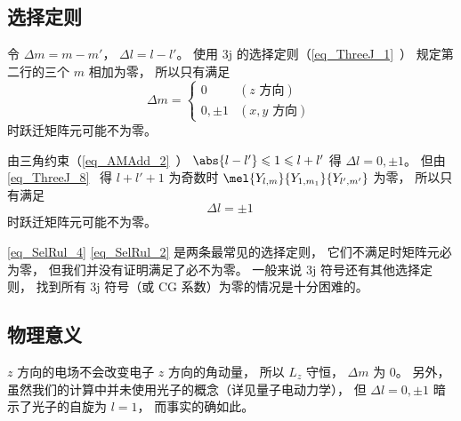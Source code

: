 \subsection{选择定则}
令 $\Delta m = m - m'$， $\Delta l = l - l'$。 使用 3j 的选择定则（\autoref{eq_ThreeJ_1}~） 规定第二行的三个 $m$ 相加为零， 所以只有满足
\begin{equation}\label{eq_SelRul_4}
\Delta m =
\begin{cases}
0 & (\text{$z$ 方向}) \\
0, \pm 1 & (\text{$x, y$ 方向})
\end{cases}~
\end{equation}
时跃迁矩阵元可能不为零。

由三角约束（\autoref{eq_AMAdd_2}~） $\abs{l-l'} \leqslant 1 \leqslant l + l'$ 得 $\Delta l = 0, \pm 1$。 但由\autoref{eq_ThreeJ_8}~ 得 $l + l' + 1$ 为奇数时 $\mel{Y_{l,m}}{Y_{1,m_1}}{Y_{l',m'}}$ 为零， 所以只有满足
\begin{equation}\label{eq_SelRul_2}
 \Delta l = \pm 1~
\end{equation}
时跃迁矩阵元可能不为零。

\autoref{eq_SelRul_4} \autoref{eq_SelRul_2} 是两条最常见的选择定则， 它们不满足时矩阵元必为零， 但我们并没有证明满足了必不为零。 一般来说 3j 符号还有其他选择定则， 找到所有 3j 符号（或 CG 系数）为零的情况是十分困难的。

\subsection{物理意义}
$z$ 方向的电场不会改变电子 $z$ 方向的角动量， 所以 $L_z$ 守恒， $\Delta m$ 为 0。 另外， 虽然我们的计算中并未使用光子的概念（详见量子电动力学）， 但 $\Delta l = 0, \pm 1$ 暗示了光子的自旋为 $l=1$， 而事实的确如此。
